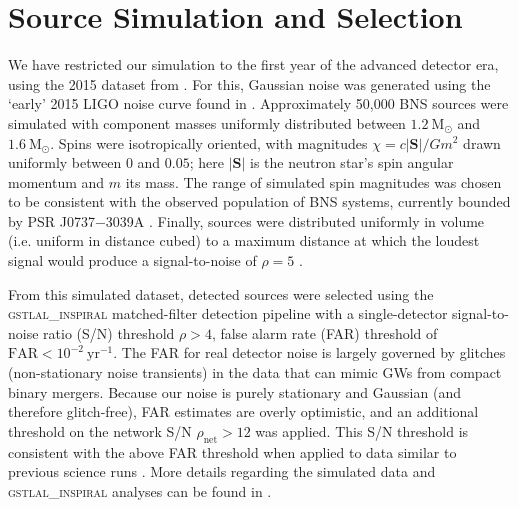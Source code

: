 \section{Source Simulation and Selection}

We have restricted our simulation to the first year of the advanced detector era, using the 2015 dataset from \citet{Singer_2014}.  For this, Gaussian noise was generated using the `early' 2015 LIGO noise curve found in \citet{Barsotti:2012}.  Approximately 50,000 BNS sources were simulated with component masses uniformly distributed between $1.2~\mathrm{M}_\odot$ and $1.6~\mathrm{M}_\odot$.  Spins were isotropically oriented, with magnitudes $\chi = c |\mathbf{S}|/G m^2$ drawn uniformly between $0$ and $0.05$; here $|\mathbf{S}|$ is the neutron star's spin angular momentum and $m$ its mass.  The range of simulated spin magnitudes was chosen to be consistent with the observed population of BNS systems, currently bounded by PSR J0737$-$3039A \citep{Burgay_2003,Brown_2012}.  Finally, sources were distributed uniformly in volume (i.e. uniform in distance cubed) to a maximum distance at which the loudest signal would produce a signal-to-noise of $\rho = 5$ \citep{Singer_2014}.

From this simulated dataset, detected sources were selected using the \textsc{gstlal\_inspiral} matched-filter detection pipeline \citep{Cannon_2012} with a single-detector signal-to-noise ratio (S/N) threshold $\rho>4$, false alarm rate (FAR) threshold of $\mathrm{FAR}<10^{-2}~\mathrm{yr}^{-1}$.  The FAR for real detector noise is largely governed by glitches (non-stationary noise transients) in the data that can mimic GWs from compact binary mergers.  Because our noise is purely stationary and Gaussian (and therefore glitch-free), FAR estimates are overly optimistic, and an additional threshold on the network S/N $\rho_\mathrm{net} > 12$ was applied.  This S/N threshold is consistent with the above FAR threshold when applied to data similar to previous science runs \cite{2013arXiv1304.0670L,Berry_2014}.  More details regarding the simulated data and \textsc{gstlal\_inspiral} analyses can be found in \citet{Singer_2014}.